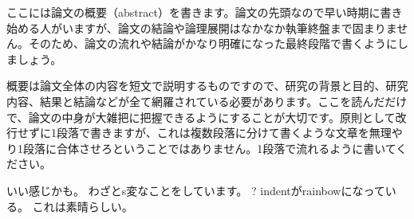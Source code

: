 ここには論文の概要（abstract）を書きます。論文の先頭なので早い時期に書き始める人がいますが、論文の結論や論理展開はなかなか執筆終盤まで固まりません。そのため、論文の流れや結論がかなり明確になった最終段階で書くようにしましょう。

概要は論文全体の内容を短文で説明するものですので、研究の背景と目的、研究内容、結果と結論などが全て網羅されている必要があります。ここを読んだだけで、論文の中身が大雑把に把握できるようにすることが大切です。原則として改行せずに1段落で書きますが、これは複数段落に分けて書くような文章を無理やり1段落に合体させろということではありません。1段落で流れるように書いてください。

いい感じかも。
わざとs変なことをしています。\cite{Okumura2005}
?
    indentがrainbowになっている。
        これは素晴らしい。
